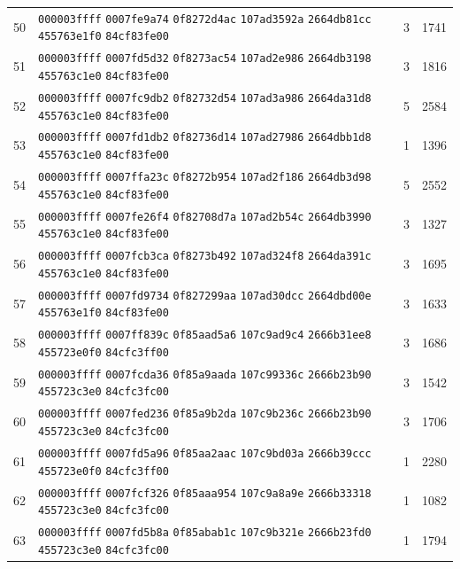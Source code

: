 \begin{longtable}{@{}r p{12cm} r r@{}}
50 & \texttt{000003ffff} \texttt{0007fe9a74} \texttt{0f8272d4ac} \texttt{107ad3592a} \texttt{2664db81cc} \texttt{455763e1f0} \texttt{84cf83fe00} & 3 & 1741 \\
51 & \texttt{000003ffff} \texttt{0007fd5d32} \texttt{0f8273ac54} \texttt{107ad2e986} \texttt{2664db3198} \texttt{455763c1e0} \texttt{84cf83fe00} & 3 & 1816 \\
52 & \texttt{000003ffff} \texttt{0007fc9db2} \texttt{0f82732d54} \texttt{107ad3a986} \texttt{2664da31d8} \texttt{455763c1e0} \texttt{84cf83fe00} & 5 & 2584 \\
53 & \texttt{000003ffff} \texttt{0007fd1db2} \texttt{0f82736d14} \texttt{107ad27986} \texttt{2664dbb1d8} \texttt{455763c1e0} \texttt{84cf83fe00} & 1 & 1396 \\
54 & \texttt{000003ffff} \texttt{0007ffa23c} \texttt{0f8272b954} \texttt{107ad2f186} \texttt{2664db3d98} \texttt{455763c1e0} \texttt{84cf83fe00} & 5 & 2552 \\
55 & \texttt{000003ffff} \texttt{0007fe26f4} \texttt{0f82708d7a} \texttt{107ad2b54c} \texttt{2664db3990} \texttt{455763c1e0} \texttt{84cf83fe00} & 3 & 1327 \\
56 & \texttt{000003ffff} \texttt{0007fcb3ca} \texttt{0f8273b492} \texttt{107ad324f8} \texttt{2664da391c} \texttt{455763c1e0} \texttt{84cf83fe00} & 3 & 1695 \\
57 & \texttt{000003ffff} \texttt{0007fd9734} \texttt{0f827299aa} \texttt{107ad30dcc} \texttt{2664dbd00e} \texttt{455763e1f0} \texttt{84cf83fe00} & 3 & 1633 \\
58 & \texttt{000003ffff} \texttt{0007ff839c} \texttt{0f85aad5a6} \texttt{107c9ad9c4} \texttt{2666b31ee8} \texttt{455723e0f0} \texttt{84cfc3ff00} & 3 & 1686 \\
59 & \texttt{000003ffff} \texttt{0007fcda36} \texttt{0f85a9aada} \texttt{107c99336c} \texttt{2666b23b90} \texttt{455723c3e0} \texttt{84cfc3fc00} & 3 & 1542 \\
60 & \texttt{000003ffff} \texttt{0007fed236} \texttt{0f85a9b2da} \texttt{107c9b236c} \texttt{2666b23b90} \texttt{455723c3e0} \texttt{84cfc3fc00} & 3 & 1706 \\
61 & \texttt{000003ffff} \texttt{0007fd5a96} \texttt{0f85aa2aac} \texttt{107c9bd03a} \texttt{2666b39ccc} \texttt{455723e0f0} \texttt{84cfc3ff00} & 1 & 2280 \\
62 & \texttt{000003ffff} \texttt{0007fcf326} \texttt{0f85aaa954} \texttt{107c9a8a9e} \texttt{2666b33318} \texttt{455723c3e0} \texttt{84cfc3fc00} & 1 & 1082 \\
63 & \texttt{000003ffff} \texttt{0007fd5b8a} \texttt{0f85abab1c} \texttt{107c9b321e} \texttt{2666b23fd0} \texttt{455723c3e0} \texttt{84cfc3fc00} & 1 & 1794 \\

\end{longtable}
